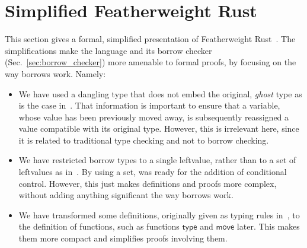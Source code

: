 \section{Simplified Featherweight Rust}\label{sec:featherweight}

This section gives a formal, simplified presentation of Featherweight
Rust~\cite{Pea21}. The simplifications make the language and its
borrow checker (Sec.~\ref{sec:borrow_checker})
more amenable to formal proofs, by focusing on the way borrows work. Namely:
%
\begin{itemize}
\item We have used a dangling type that does not embed the
  original, \emph{ghost} type as is the case in~\cite{Pea21}.
  That information is important to ensure that a variable, whose value has been
  previously moved away, is subsequently reassigned a value compatible
  with its original type. However, this is irrelevant here,
  since it is related to traditional type checking and not to borrow checking.
\item We have restricted borrow types to a single leftvalue, rather than to a set of
  leftvalues as in~\cite{Pea21}. By using a set, \cite{Pea21}
  was ready for the addition of conditional control. However, this just makes definitions
  and proofs more complex, without adding anything significant \wrt the way borrows work.
\item We have transformed some definitions, originally given as typing rules in~\cite{Pea21},
  to the definition of functions, such as functions $\mathsf{type}$ and $\mathsf{move}$ later.
  This makes them more compact and simplifies proofs involving them.
\end{itemize}

